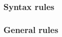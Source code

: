 \begin{syntax}
  \begin{0-1}
    \begin{1=}
      \identifier \\
      \literal
    \end{1=} \\
  \end{0-1}

  \begin{0-1}
     \identifier
  \end{0-1}

  \begin{0-1}
     \identifier
  \end{0-1}
\end{syntax}

\subsubsection{Syntax rules}

\subsubsection{General rules}


